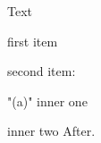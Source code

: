 

\document
Text
\roster\item first item
\item second item:
  \roster\item"(a)" inner one
  \item inner two\endroster
\endroster
After.
\enddocument
